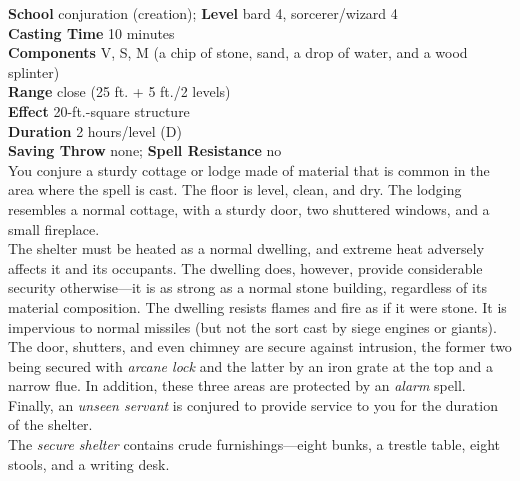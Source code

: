 \textbf{School} conjuration (creation); \textbf{Level} bard 4, sorcerer/wizard 4\\
\textbf{Casting Time} 10 minutes\\
\textbf{Components} V, S, M (a chip of stone, sand, a drop of water, and a wood splinter)\\
\textbf{Range} close (25 ft. + 5 ft./2 levels)\\
\textbf{Effect} 20-ft.-square structure\\
\textbf{Duration} 2 hours/level (D)\\
\textbf{Saving Throw} none; \textbf{Spell Resistance} no\\
You conjure a sturdy cottage or lodge made of material that is common in the area where the spell is cast. The floor is level, clean, and dry. The lodging resembles a normal cottage, with a sturdy door, two shuttered windows, and a small fireplace.\\
The shelter must be heated as a normal dwelling, and extreme heat adversely affects it and its occupants. The dwelling does, however, provide considerable security otherwise—it is as strong as a normal stone building, regardless of its material composition. The dwelling resists flames and fire as if it were stone. It is impervious to normal missiles (but not the sort cast by siege engines or giants).\\
The door, shutters, and even chimney are secure against intrusion, the former two being secured with \textit{arcane lock }and the latter by an iron grate at the top and a narrow flue. In addition, these three areas are protected by an \textit{alarm }spell. Finally, an \textit{unseen servant }is conjured to provide service to you for the duration of the shelter.\\
The \textit{secure shelter }contains crude furnishings—eight bunks, a trestle table, eight stools, and a writing desk.\\

